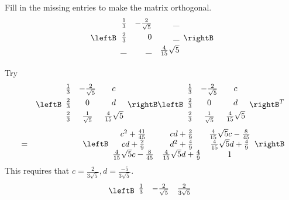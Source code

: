 \begin{enumialphparenastyle}
\begin{ex} Fill in the missing entries to make the matrix orthogonal. 
\begin{equation*}
\leftB 
\begin{array}{rrr}
\vspace{0.05in}\frac{1}{3} & -\frac{2}{\sqrt{5}} & \_ \\ 
\vspace{0.05in}\frac{2}{3} & 0 & \_ \\ 
\vspace{0.05in}\_ & \_ & \frac{4}{15}\sqrt{5}
\end{array}
\rightB
\end{equation*}
\begin{sol}
Try
\begin{eqnarray*}
&&\leftB
\begin{array}{ccc}
\vspace{0.05in}\frac{1}{3} & -\frac{2}{\sqrt{5}} & c \\
\vspace{0.05in}\frac{2}{3} & 0 & d \\
\vspace{0.05in}\frac{2}{3} & \frac{1}{\sqrt{5}} & \frac{4}{15}\sqrt{5}
\end{array}
\rightB \leftB
\begin{array}{ccc}
\vspace{0.05in}\frac{1}{3} & -\frac{2}{\sqrt{5}} & c \\
\vspace{0.05in}\frac{2}{3} & 0 & d \\
\vspace{0.05in}\frac{2}{3} & \frac{1}{\sqrt{5}} & \frac{4}{15}\sqrt{5}
\end{array}
\rightB ^{T} \\
&=&\leftB
\begin{array}{ccc}
c^{2}+\frac{41}{45} & cd+\frac{2}{9} & \frac{4}{15}\sqrt{5}c-\frac{8}{45} \\
cd+\frac{2}{9} & d^{2}+\frac{4}{9} & \frac{4}{15}\sqrt{5}d+\frac{4}{9} \\
\frac{4}{15}\sqrt{5}c-\frac{8}{45} & \frac{4}{15}\sqrt{5}d+\frac{4}{9} & 1
\end{array}
\rightB
\end{eqnarray*}
This requires that $c=\frac{2}{3\sqrt{5}},d=\frac{-5}{3\sqrt{5}}$.
\[
\leftB
\begin{array}{ccc}
\vspace{0.05in}\frac{1}{3} & -\frac{2}{\sqrt{5}} & \frac{2}{3\sqrt{5}} \\

\end{array}\]
\end{sol}
\end{ex}
\end{enumialphparenastyle}
